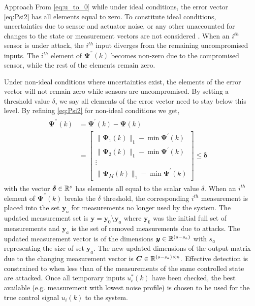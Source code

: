 \begin{section}{Approach}
From \eqref{eq:u_to_0} while under ideal conditions, the error vector \eqref{eq:Psi2} has all elements equal to zero. To constitute ideal conditions, uncertainties due to sensor and actuator noise, or any other unaccounted for changes to the state or measurement vectors are not considered . When an $i^{th}$ sensor is under attack, the $i^{th}$ input diverges from the remaining uncompromised inputs. The $i^{th}$ element of $\bm{\Psi}^{''}(k)$ becomes non-zero due to the compromised sensor, while the rest of the elements remain zero. 

Under non-ideal conditions where uncertainties exist, the elements of the error vector will not remain zero while sensors are uncompromised. By setting a threshold value $\delta$, we say all elements of the error vector need to stay below this level. By refining \eqref{eq:Psi2} for non-ideal conditions we get,
    \begin{align}
    \begin{split}
    \label{eq:Psi2_nonideal}
	\bm{\Psi^{''}}(k)&=\bm{\Psi^{'}}(k)-\bm{\Psi}(k) \\
	& =\begin{bmatrix} \lVert{\bm{\Psi}_1(k)}\rVert_1 - \min \bm{\Psi}^{'}(k)\\ \lVert{\bm{\Psi}_2(k)}\rVert_1 - \min \bm{\Psi}^{'}(k) \\ \vdots \\ \lVert{\bm{\Psi}_M(k)}\rVert_1 - \min \bm{\Psi}^{'}(k) \end{bmatrix} \leq \bm{\delta}
	\end{split}
	\end{align}
with the vector $\bm{\delta} \in \mathbb{R}^s$ has elements all equal to the scalar value $\delta$. When an $i^{th}$ element of $\bm{\Psi^{''}}(k)$ breaks the $\delta$ threshold, the corresponding $i^{th}$ measurement is placed into the set $\bm{y}_a$ for measurements no longer used by the system. The updated measurement set is $\bm{y}=\bm{y}_0\setminus\bm{y}_a$ where $\bm{y}_0$ was the initial full set of measurements and $\bm{y}_a$ is the set of removed measurements due to attacks. The updated measurement vector is of the dimensions $\bm{y} \in \mathbb{R}^{(s-s_{a})}$ with $s_a$ representing the size of set $\bm{y}_a$. The new updated dimensions of the output matrix due to the changing measurement vector is $\bm{C} \in \mathbb{R}^{(s-s_a)\times n}$. Effective detection is constrained to when less than of the measurements of the same controlled state are attacked. Once all temporary inputs $u_i^*(k)$ have been checked, the best available (e.g. measurement with lowest noise profile) is chosen to be used for the true control signal $u_i(k)$ to the system.




\end{section}
